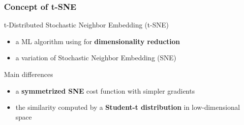 \documentclass{beamer}
\begin{document}
% 
% 
% 
% 
\begin{frame}
  \frametitle{Concept of t-SNE}

t-Distributed Stochastic Neighbor Embedding (t-SNE)

  \begin{itemize}
    \item a ML algorithm using for \textbf{dimensionality reduction}
    \item a variation of Stochastic Neighbor Embedding (SNE)
  \end{itemize}

Main differences

   \begin{itemize}
    \item a \textbf{symmetrized SNE} cost function with simpler gradients
    \item the similarity computed by a \textbf{Student-t distribution} in low-dimensional space
  \end{itemize}

\end{frame}
\end{document}
